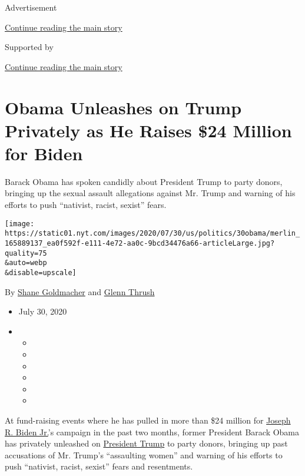 Advertisement

\protect\hyperlink{after-top}{Continue reading the main story}

Supported by

\protect\hyperlink{after-sponsor}{Continue reading the main story}

\hypertarget{obama-unleashes-on-trump-privately-as-he-raises-24-million-for-biden}{%
\section{Obama Unleashes on Trump Privately as He Raises \$24 Million
for
Biden}\label{obama-unleashes-on-trump-privately-as-he-raises-24-million-for-biden}}

Barack Obama has spoken candidly about President Trump to party donors,
bringing up the sexual assault allegations against Mr. Trump and warning
of his efforts to push ``nativist, racist, sexist'' fears.

\texttt{[image: https://static01.nyt.com/images/2020/07/30/us/politics/30obama/merlin\_165889137\_ea0f592f-e111-4e72-aa0c-9bcd34476a66-articleLarge.jpg?quality=75\\\&auto=webp\\\&disable=upscale]}

By \href{https://www.nytimes.com/by/shane-goldmacher}{Shane Goldmacher}
and \href{https://www.nytimes.com/by/glenn-thrush}{Glenn Thrush}

\begin{itemize}
\item
  July 30, 2020
\item
  \begin{itemize}
  \item
  \item
  \item
  \item
  \item
  \item
  \end{itemize}
\end{itemize}

At fund-raising events where he has pulled in more than \$24 million for
\href{https://www.nytimes.com/interactive/2020/us/elections/joe-biden.html}{Joseph
R. Biden Jr.}'s campaign in the past two months, former President Barack
Obama has privately unleashed on
\href{https://www.nytimes.com/interactive/2020/us/elections/donald-trump.html}{President
Trump} to party donors, bringing up past accusations of Mr. Trump's
``assaulting women'' and warning of his efforts to push ``nativist,
racist, sexist'' fears and resentments.

